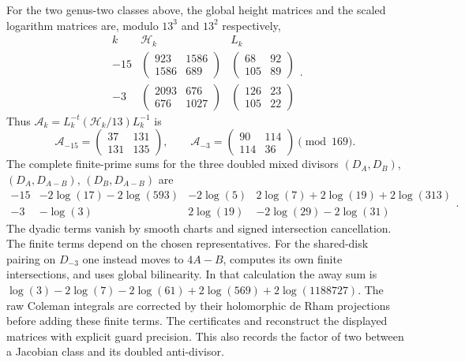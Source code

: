 For the two genus-two classes above, the global height matrices and the
scaled logarithm matrices are, modulo $13^3$ and $13^2$ respectively,
\[
\begin{array}{c|c|c}
 k&\mathcal H_k&L_k\\ \hline
 -15&\begin{pmatrix}923&1586\\1586&689\end{pmatrix}
     &\begin{pmatrix}68&92\\105&89\end{pmatrix}\\[3pt]
 -3&\begin{pmatrix}2093&676\\676&1027\end{pmatrix}
     &\begin{pmatrix}126&23\\105&22\end{pmatrix}
\end{array}.
\]
Thus $\mathcal A_k=L_k^{-t}(\mathcal H_k/13)L_k^{-1}$ is
\begin{equation}\label{eq:t10-heightmat}
 \mathcal A_{-15}=\begin{pmatrix}37&131\\131&135\end{pmatrix},\qquad
 \mathcal A_{-3}=\begin{pmatrix}90&114\\114&36\end{pmatrix}
                  \pmod{169}.
\end{equation}
The complete finite-prime sums for the three doubled mixed divisors
$(D_A,D_B)$, $(D_A,D_{A-B})$, $(D_B,D_{A-B})$ are
\[
\begin{array}{c|lll}
-15&-2\log(17)-2\log(593)&-2\log(5)&
                      2\log(7)+2\log(19)+2\log(313)\\
-3&-\log(3)&2\log(19)&-2\log(29)-2\log(31)
\end{array}.
\]
The dyadic terms vanish by smooth charts and signed intersection
cancellation. The finite terms depend on the chosen representatives.
For the shared-disk pairing on $D_{-3}$ one instead moves to
$4A-B$, computes its own finite intersections, and uses global
bilinearity. In that calculation the away sum is
$\log(3)-2\log(7)-2\log(61)+2\log(569)+2\log(1188727)$.
The raw Coleman integrals are corrected by their holomorphic de Rham
projections before adding these finite terms. The certificates
 and
 reconstruct the displayed
matrices with explicit guard precision. This also records the factor
of two between a Jacobian class and its doubled anti-divisor.

